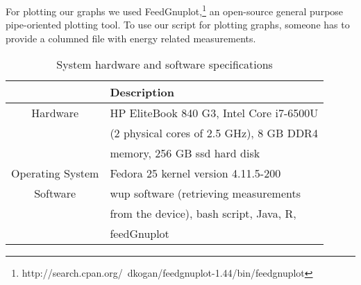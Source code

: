 For plotting our graphs we used FeedGnuplot,\footnote{http://search.cpan.org/~dkogan/feedgnuplot-1.44/bin/feedgnuplot} 
an open-source general purpose pipe-oriented plotting tool. 
To use our script for plotting graphs, someone has to provide a 
columned file with energy related measurements.

\begin{table}
		\begin{threeparttable}
	\caption{System hardware and software specifications}
	\label{laptop_specs}
	\begin{tabular}{cl}
		\toprule
		&Description\\
		\midrule
		Hardware	& HP EliteBook 840 G3, Intel Core i7-6500U \\
					& (2 physical cores of 2.5 GHz), 8 GB DDR4  \\
					& memory, 256 GB {\sc ssd}  hard disk \\
		Operating  System & Fedora 25 kernel version 4.11.5-200  \\			
		Software 	& {\sc wup} software (retrieving measurements \\
					& from the device), bash script, Java, R, \\
					& feedGnuplot \\
		\bottomrule
	\end{tabular}
	\end{threeparttable}
\end{table}

